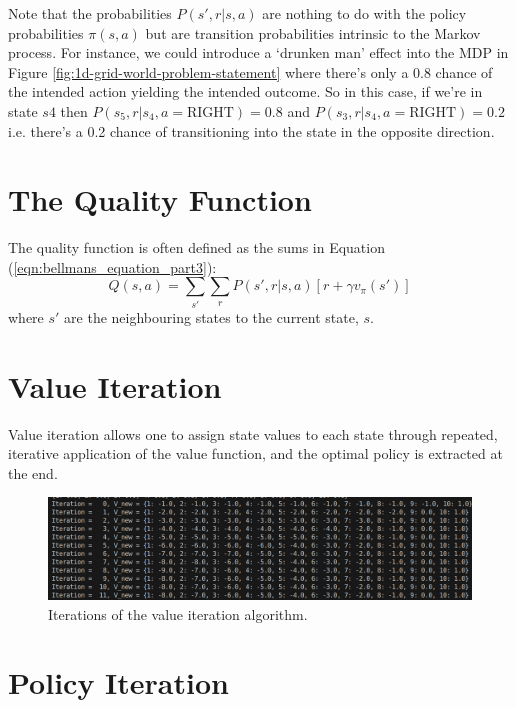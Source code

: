 \documentclass[a4paper,11pt]{article}
\begin{document}
Note that the probabilities $P(s',r|s,a)$ are nothing to do with the policy probabilities $\pi(s,a)$ but are transition probabilities intrinsic to the Markov process.  For instance, we could introduce a `drunken man' effect into the MDP in Figure \ref{fig:1d-grid-world-problem-statement} where there's only a 0.8 chance of the intended action yielding the intended outcome.  So in this case, if we're in state $s4$ then $P(s_5,r|s_4, a=\text{RIGHT}) = 0.8$ and $P(s_3,r|s_4, a=\text{RIGHT}) = 0.2$ i.e. there's a 0.2 chance of transitioning into the state in the opposite direction.





\section{The Quality Function}

The quality function is often defined as the sums in Equation (\ref{eqn:bellmans_equation_part3}):
\begin{equation} \label{eqn:quality_function_Q}
    Q(s,a) = \sum_{s'} \sum_r P(s',r|s,a) [r + \gamma v_{\pi}(s')]
\end{equation}
where $s'$ are the neighbouring states to the current state, $s$.  


\section{Value Iteration}

Value iteration allows one to assign state values to each state through repeated, iterative application of the value function, and the optimal policy is extracted at the end.  



\begin{figure}
    \includegraphics[width=\textwidth]{images/iters-of-value-iteration-1d-grid-world-code-output.png}
    \caption{Iterations of the value iteration algorithm.}
    \label{fig:iters-of-value-iteration-1d-grid-world-code-output}
\end{figure}


\section{Policy Iteration}
\end{document}
